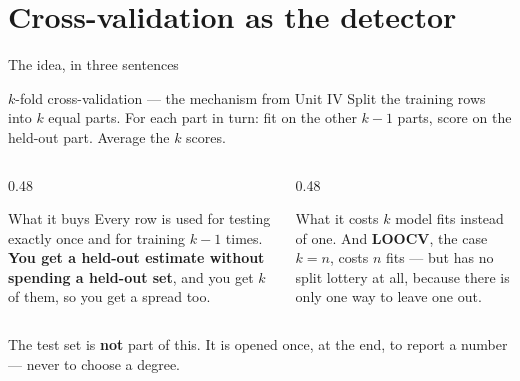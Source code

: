 \documentclass[aspectratio=169]{beamer}
\begin{document}
\section[CV]{Cross-validation as the detector}
\label{sec:cv}

\begin{frame}[shrink=6]{The idea, in three sentences}
  \begin{block}{$k$-fold cross-validation --- the mechanism from Unit IV}
    \small Split the training rows into $k$ equal parts. For each part in
    turn: fit on the other $k-1$ parts, score on the held-out part. Average
    the $k$ scores.
  \end{block}
  \vspace{0.2em}
  \begin{columns}[T]
    \begin{column}{0.48\textwidth}
      \begin{exampleblock}{What it buys}
        \small Every row is used for testing exactly once and for training
        $k-1$ times. \textbf{You get a held-out estimate without spending a
        held-out set}, and you get $k$ of them, so you get a spread too.
      \end{exampleblock}
    \end{column}
    \begin{column}{0.48\textwidth}
      \begin{alertblock}{What it costs}
        \small $k$ model fits instead of one. And \textbf{LOOCV}, the case
        $k = n$, costs $n$ fits --- but has no split lottery at all, because
        there is only one way to leave one out.
      \end{alertblock}
    \end{column}
  \end{columns}
  \vspace{0.2em}
  \begin{center}\small
    The test set is \textbf{not} part of this. It is opened once, at the end,
    to report a number --- never to choose a degree.
  \end{center}
\end{frame}
\end{document}
